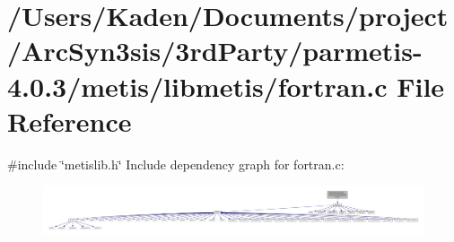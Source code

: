 \hypertarget{a00200}{}\section{/\+Users/\+Kaden/\+Documents/project/\+Arc\+Syn3sis/3rd\+Party/parmetis-\/4.0.3/metis/libmetis/fortran.c File Reference}
\label{a00200}
{\ttfamily \#include \char`\"{}metislib.\+h\char`\"{}}\newline
Include dependency graph for fortran.\+c\+:\nopagebreak
\begin{figure}[H]
\begin{center}
\leavevmode
\includegraphics[width=350pt]{a00201}
\end{center}
\end{figure}
